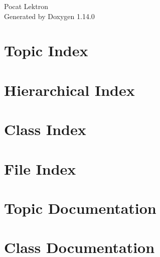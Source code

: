 \documentclass[twoside]{book}
\newcommand{\+}{\discretionary{\mbox{\scriptsize$\hookleftarrow$}}{}{}}
\newcommand{\clearemptydoublepage}{%
    \newpage{\pagestyle{empty}\cleardoublepage}%
  }
\begin{document}
  \raggedbottom
    \hypersetup{pageanchor=false,
                bookmarksnumbered=true,
                pdfencoding=unicode
               }
  \begin{titlepage}
  \vspace*{7cm}
  \begin{center}%
  {\Large Pocat Lektron}\\
  \vspace*{1cm}
  {\large Generated by Doxygen 1.14.0}\\
  \end{center}
  \end{titlepage}
  \clearemptydoublepage
  \tableofcontents
  \clearemptydoublepage
  \hypersetup{pageanchor=true}

\chapter{Topic Index}

\chapter{Hierarchical Index}

\chapter{Class Index}

\chapter{File Index}

\chapter{Topic Documentation}

\chapter{Class Documentation}





\end{document}
